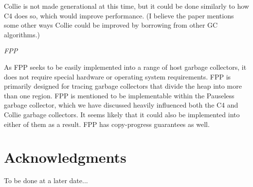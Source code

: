\documentclass{sig-alternate}
\begin{document}
Collie is not made generational at this time, but it could be done similarly
to how C4 does so, which would improve performance. (I believe the paper
mentions some other ways Collie could be improved by borrowing from other
GC algorithms.)

\emph{FPP}

As FPP seeks to be easily implemented into a range of host garbage collectors, 
it does not require special hardware or operating system requirements. FPP
is primarily designed for tracing garbage collectors that divide the heap
into more than one region. 
FPP is mentioned to be implementable within the Pauseless garbage collector,
which we have discussed heavily influenced both the C4 and Collie garbage collectors.
It seems likely that it could also be implemented into either of them as a result.
FPP has copy-progress guarantees as well.


\section*{Acknowledgments}
\label{sec:acknowledgments}

To be done at a later date...



  
\end{document}
